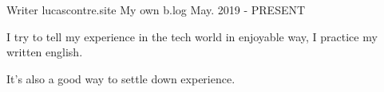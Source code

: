 

\begin{cventries}

  \cventry
  {Writer} %
  {lucascontre.site} %
  {My own b.log} %
  {May. 2019 - PRESENT} %
  {
  \begin{cvitems} %
    \item {I try to tell my experience in the tech world in enjoyable way, I practice my written english.}
    \item {It's also a good way to settle down experience.}
  \end{cvitems}
  }


\end{cventries}
